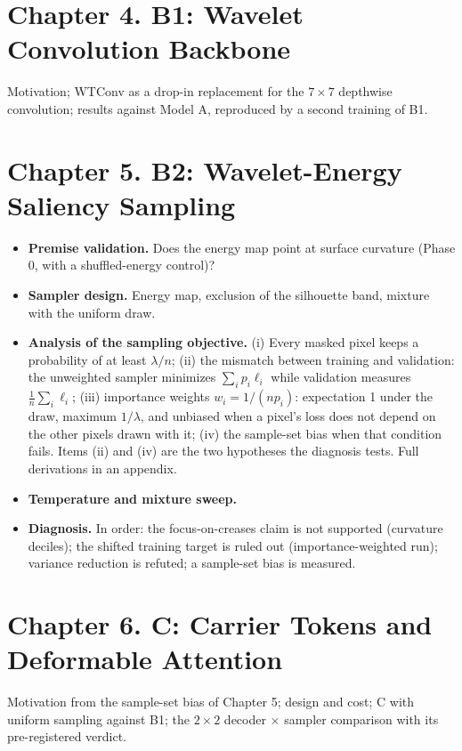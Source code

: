 \documentclass[Main.tex]{subfiles}
\begin{document}
\section*{Chapter 4. B1: Wavelet Convolution Backbone }
Motivation; WTConv as a drop-in replacement for the $7\times7$ depthwise convolution; results
against Model A, reproduced by a second training of B1.

\section*{Chapter 5. B2: Wavelet-Energy Saliency Sampling }
\begin{itemize}
  \item[5.1] \textbf{Premise validation.} Does the energy map point at surface curvature
    (Phase 0, with a shuffled-energy control)?
  \item[5.2] \textbf{Sampler design.} Energy map, exclusion of the silhouette band, mixture with
    the uniform draw.
  \item[5.3] \textbf{Analysis of the sampling objective.} (i) Every masked pixel keeps a
    probability of at least $\lambda / n$; (ii) the mismatch between training and validation: the
    unweighted sampler minimizes $\sum_i p_i \ell_i$ while validation measures
    $\frac{1}{n}\sum_i \ell_i$; (iii) importance weights $w_i = 1/(n p_i)$: expectation 1 under the
    draw, maximum $1/\lambda$, and unbiased when a pixel's loss does not depend on the other pixels
    drawn with it; (iv) the sample-set bias when that condition fails. Items (ii) and (iv) are the
    two hypotheses the diagnosis tests. Full derivations in an appendix.
  \item[5.4] \textbf{Temperature and mixture sweep.}
  \item[5.5] \textbf{Diagnosis.} In order: the focus-on-creases claim is not supported
    (curvature deciles); the shifted training target is ruled out (importance-weighted run);
    variance reduction is refuted; a sample-set bias is measured.
\end{itemize}

\section*{Chapter 6. C: Carrier Tokens and Deformable Attention }
Motivation from the sample-set bias of Chapter 5; design and cost; C with uniform sampling against
B1; the $2\times2$ decoder $\times$ sampler comparison with its pre-registered verdict.
\end{document}
